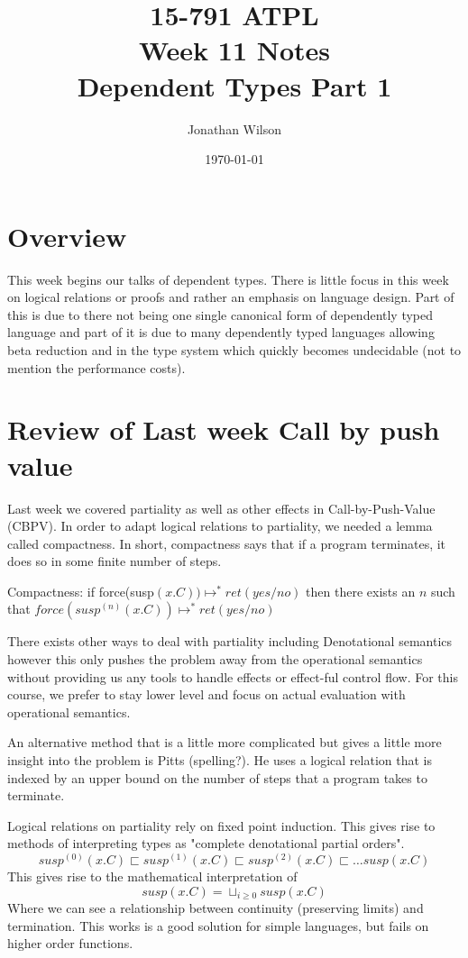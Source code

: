 \documentclass[11pt]{article}
\title{15-791 ATPL \\ Week 11 Notes \\ Dependent Types Part 1}
\author{Jonathan Wilson}
\date{\today}
\begin{document}
\maketitle{}

\section*{Overview}

This week begins our talks of dependent types. There is little focus in this week on logical relations or proofs and rather an emphasis on language design. Part of this is due to there not being one single canonical form of dependently typed language and part of it is due to many dependently typed languages allowing beta reduction and in the type system which quickly becomes undecidable (not to mention the performance costs).

\section*{Review of Last week Call by push value}

Last week we covered partiality as well as other effects in Call-by-Push-Value (CBPV). In order to adapt logical relations to partiality, we needed a lemma called compactness. In short, compactness says that if a program terminates, it does so in some finite number of steps.

Compactness: if force(susp$(x.C)) \mapsto^* ret(yes / no)$ then there exists an $n$ such that $force(susp^{(n)}(x.C)) \mapsto^* ret(yes / no)$

There exists other ways to deal with partiality including Denotational semantics however this only pushes the problem away from the operational semantics without providing us any tools to handle effects or effect-ful control flow. For this course, we prefer to stay lower level and focus on actual evaluation with operational semantics.

An alternative method that is a little more complicated but gives a little more insight into the problem is Pitts (spelling?). He uses a logical relation that is indexed by an upper bound on the number of steps that a program takes to terminate.

Logical relations on partiality rely on fixed point induction. This gives rise to methods of interpreting types as "complete denotational partial orders".
$$susp^{(0)}(x.C) \sqsubset susp^{(1)}(x.C) \sqsubset susp^{(2)}(x.C) \sqsubset \dots susp(x.C)$$
This gives rise to the mathematical interpretation of
$$susp(x.C) = \sqcup_{i \ge 0} susp(x.C)$$
Where we can see a relationship between continuity (preserving limits) and termination. This works is a good solution for simple languages, but fails on higher order functions.
\end{document}
